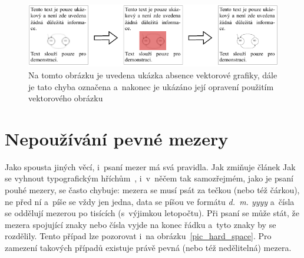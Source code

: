 \begin{figure}[H]
    \centering
    \includegraphics[width=\linewidth]{obrazky-figures/vector_graphics_example.pdf}
    \caption{
        Na tomto obrázku je uvedena ukázka absence vektorové grafiky, dále je
        tato chyba označena a~nakonec je ukázáno její opravení použitím 
        vektorového obrázku
    }
    \label{pic_vector_graphics}
\end{figure}


\section{Nepoužívání pevné mezery}
Jako spousta jiných věcí, i~psaní mezer má svá pravidla. Jak zmiňuje
článek Jak se vyhnout typografickým hříchům~\cite{Ctenar_12_2015}, i~v~něčem
tak samozřejmém, jako je psaní pouhé
mezery, se často chybuje: mezera se musí psát za tečkou (nebo též čárkou), ne před
ní a~píše se vždy jen jedna, data se píšou ve formátu \emph{d.~m. yyyy}
a~čísla se oddělují mezerou po tisících (s~výjimkou letopočtu). Při psaní se může
stát, že mezera spojující znaky nebo čísla vyjde na konec řádku a~tyto znaky
by se rozdělily. Tento případ lze pozorovat i~na obrázku~\ref{pic_hard_space}.
Pro zamezení takových případů existuje právě pevná (nebo též nedělitelná)
mezera.


